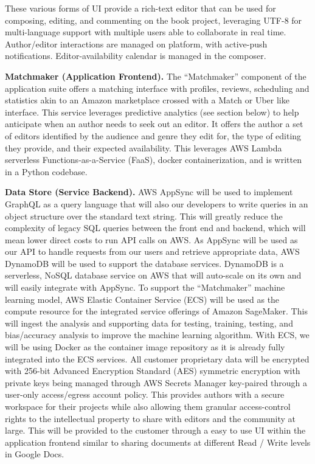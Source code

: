\documentclass[11pt,openany]{book}
\begin{document}
These various forms of UI provide a rich-text editor that can be used
for composing, editing, and commenting on the book project, leveraging
UTF-8 for multi-language support with multiple users able to collaborate
in real time. Author/editor interactions are managed on platform, with
active-push notifications. Editor-availability calendar is managed in
the composer.

\textbf{Matchmaker (Application Frontend).} The ``Matchmaker'' component
of the application suite offers a matching interface with profiles,
reviews, scheduling and statistics akin to an Amazon marketplace crossed
with a Match or Uber like interface. This service leverages predictive
analytics (see section below) to help anticipate when an author needs to
seek out an editor. It offers the author a set of editors identified by
the audience and genre they edit for, the type of editing they provide,
and their expected availability. This leverages AWS Lambda serverless
Functions-as-a-Service (FaaS), docker containerization, and is written
in a Python codebase.

\textbf{Data Store (Service Backend).} AWS AppSync will be used to
implement GraphQL as a query language that will also our developers to
write queries in an object structure over the standard text string. This
will greatly reduce the complexity of legacy SQL queries between the
front end and backend, which will mean lower direct costs to run API
calls on AWS. As AppSync will be used as our API to handle requests from
our users and retrieve appropriate data, AWS DynamoDB will be used to
support the database services. DynamoDB is a serverless, NoSQL database
service on AWS that will auto-scale on its own and will easily integrate
with AppSync. To support the ``Matchmaker'' machine learning model, AWS
Elastic Container Service (ECS) will be used as the compute resource for
the integrated service offerings of Amazon SageMaker. This will ingest
the analysis and supporting data for testing, training, testing, and
bias/accuracy analysis to improve the machine learning algorithm. With
ECS, we will be using Docker as the container image repository as it is
already fully integrated into the ECS services. All customer proprietary
data will be encrypted with 256-bit Advanced Encryption Standard (AES)
symmetric encryption with private keys being managed through AWS Secrets
Manager key-paired through a user-only access/egress account policy.
This provides authors with a secure workspace for their projects while
also allowing them granular access-control rights to the intellectual
property to share with editors and the community at large. This will be
provided to the customer through a easy to use UI within the application
frontend similar to sharing documents at different Read / Write levels
in Google Docs.
\end{document}
